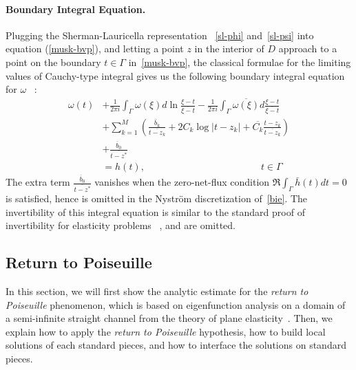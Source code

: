 \documentclass[10pt,twocolumn,letterpaper]{article}
\begin{document}
\paragraph{Boundary Integral Equation.} 
Plugging the Sherman-Lauricella representation
~\eqref{sl-phi} and~\eqref{sl-psi} into equation (\ref{musk-bvp}), 
and letting a point $z$ in the interior of $D$ approach to 
a point on the boundary $t\in \Gamma$ in~\eqref{musk-bvp}, 
the classical formulae for the limiting values of Cauchy-type integral gives us 
the following boundary integral equation for $\omega$
~\cite{muschelisviliSingularIntegralEquations1972,greengardIntegralEquationMethods1996}:
\begin{align}
  \omega(t)
   & + \frac 1{2\pi i} \int_{\Gamma} \omega(\xi) d\ln \frac{\xi - t}{\overline{\xi - t}} - \frac 1{2\pi i} \int_\Gamma \overline{\omega(\xi)} d \frac{\xi - t}{\overline{\xi - t}} \label{bie} \\
   & + \sum_{k=1}^M \left( \frac{\bar b_k}{\overline{t- z_k}} +  2C_k \log |t-z_k| + \overline{C_k} \frac{t-z_k}{\overline{ t - z_k}} \right) \nonumber                                        \\
   & + \frac{\overline b_0}{\overline{ t - z^*}} \nonumber\\
   & = h(t), 
   \quad\quad\quad\quad\quad\quad\quad\quad\quad\quad\quad\quad t\in \Gamma \nonumber
\end{align}
The extra term $\frac{\overline b_0}{\overline{t - z^*}}$ vanishes 
when the zero-net-flux condition $\Re \int_\Gamma \bar h(t) dt = 0$ is satisfied, 
hence is omitted in the Nystr\"om discretization of~\eqref{bie}.
The invertibility of this integral equation is similar
to the standard proof of invertibility for elasticity problems
~\cite{muskhelishviliBasicProblemsMathematical1977,greengardIntegralEquationMethods1996}, 
and are omitted. 

\subsection{Return to Poiseuille\label{sec:ret2poi}}

In this section, we will first show the analytic estimate for the
\textit{return to Poiseuille} phenomenon, 
which is based on eigenfunction analysis on a domain of a semi-infinite straight channel 
from the theory of plane elasticity~\cite{gregoryTractionBoundaryValue1980}. 
Then, we explain how to apply the \textit{return to Poiseuille} hypothesis, 
how to build local solutions of each standard pieces, 
and how to interface the solutions on standard pieces. 
\end{document}
